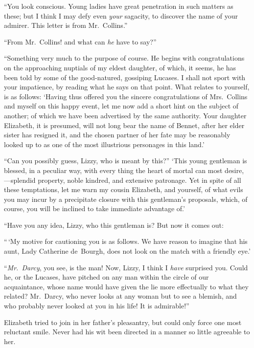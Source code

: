 ``You look conscious.  Young ladies have great penetration in
such matters as these; but I think I may defy even \emph{your}
sagacity, to discover the name of your admirer.  This letter
is from Mr.\ Collins.''

``From Mr.\ Collins! and what can \emph{he} have to say?''

``Something very much to the purpose of course.  He begins with
congratulations on the approaching nuptials of my eldest daughter,
of which, it seems, he has been told by some of the good-natured,
gossiping Lucases.  I shall not sport with your impatience, by
reading what he says on that point.  What relates to yourself, is
as follows:  `Having thus offered you the sincere congratulations
of Mrs.\ Collins and myself on this happy event, let me now add
a short hint on the subject of another; of which we have been
advertised by the same authority.  Your daughter Elizabeth, it is
presumed, will not long bear the name of Bennet, after her elder
sister has resigned it, and the chosen partner of her fate may be
reasonably looked up to as one of the most illustrious personages
in this land.'

``Can you possibly guess, Lizzy, who is meant by this?''  `This
young gentleman is blessed, in a peculiar way, with every thing
the heart of mortal can most desire,---splendid property,
noble kindred, and extensive patronage.  Yet in spite of all
these temptations, let me warn my cousin Elizabeth, and
yourself, of what evils you may incur by a precipitate closure
with this gentleman's proposals, which, of course, you will be
inclined to take immediate advantage of.'

``Have you any idea, Lizzy, who this gentleman is?  But now it
comes out:

``\,`My motive for cautioning you is as follows.  We have reason to
imagine that his aunt, Lady Catherine de~Bourgh, does not look
on the match with a friendly eye.'

``\emph{Mr.\ Darcy}, you see, is the man!  Now, Lizzy, I think I
\emph{have} surprised you.  Could he, or the Lucases, have pitched
on any man within the circle of our acquaintance, whose name
would have given the lie more effectually to what they related?
Mr.\ Darcy, who never looks at any woman but to see a blemish,
and who probably never looked at you in his life!  It is
admirable!''

Elizabeth tried to join in her father's pleasantry, but could
only force one most reluctant smile.  Never had his wit been
directed in a manner so little agreeable to her.

